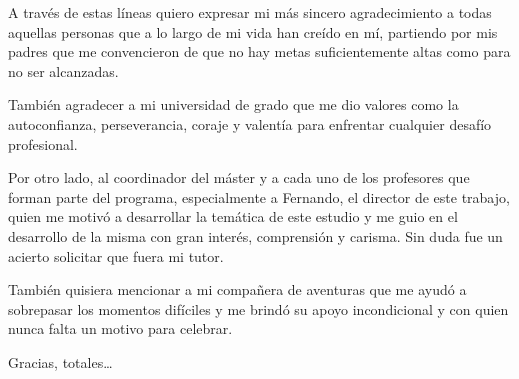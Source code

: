 \documentclass[
11pt, %
spanish, %
singlespacing, %
headsepline, %
]{MastersDoctoralThesis} %
\begin{document}
\begin{acknowledgements}
\addchaptertocentry{\acknowledgementname} %
 A través de estas líneas quiero expresar mi más sincero agradecimiento a todas aquellas personas que a lo largo de mi vida han creído en mí, partiendo por mis padres que me convencieron de que no hay metas suficientemente altas como para no ser alcanzadas.

También agradecer a mi universidad de grado que me dio valores como la autoconfianza, perseverancia, coraje y valentía para enfrentar cualquier desafío profesional.

Por otro lado, al coordinador del máster y a cada uno de los profesores que forman parte del programa, especialmente a Fernando, el director de este trabajo, quien me motivó a desarrollar la temática de este estudio y me guio en el desarrollo de la misma con gran interés, comprensión y carisma. Sin duda fue un acierto solicitar que fuera mi tutor.

También quisiera mencionar a mi compañera de aventuras que me ayudó a sobrepasar los momentos difíciles y me brindó su apoyo incondicional y con quien nunca falta un motivo para celebrar.
\\
\begin{flushright}
Gracias, totales\ldots
\end{flushright} 
\end{acknowledgements}




\tableofcontents %










\end{document}
